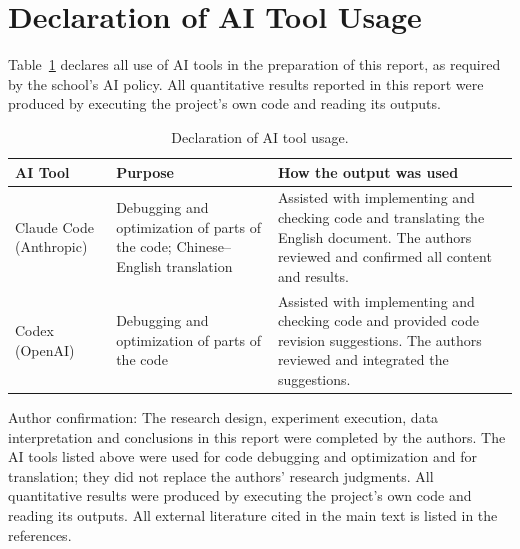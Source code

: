 \clearpage
\section{Declaration of AI Tool Usage}\label{app:ai-declaration}

Table~\ref{tab:ai-declaration} declares all use of AI tools in the preparation
of this report, as required by the school's AI policy. All quantitative results
reported in this report were produced by executing the project's own code and
reading its outputs.

\begin{table}[htbp]
  \centering
  \footnotesize
  \singlespacing
  \caption{Declaration of AI tool usage.}
  \label{tab:ai-declaration}
  \begin{tabularx}{\textwidth}{@{}>{\raggedright\arraybackslash}p{3.2cm}>{\raggedright\arraybackslash}p{4.4cm}X@{}}
    \toprule
    AI Tool & Purpose & How the output was used \\
    \midrule
    Claude Code (Anthropic) &
    Debugging and optimization of parts of the code; Chinese--English translation &
    Assisted with implementing and checking code and translating the English document. The authors reviewed and confirmed all content and results. \\
    Codex (OpenAI) &
    Debugging and optimization of parts of the code &
    Assisted with implementing and checking code and provided code revision suggestions. The authors reviewed and integrated the suggestions. \\
    \bottomrule
  \end{tabularx}
\end{table}

\noindent Author confirmation: The research design, experiment execution, data
interpretation and conclusions in this report were completed by the authors. The
AI tools listed above were used for code debugging and optimization and for
translation; they did not replace the authors'
research judgments. All quantitative results were produced by executing the
project's own code and reading its outputs. All external literature cited in
the main text is listed in the references.
